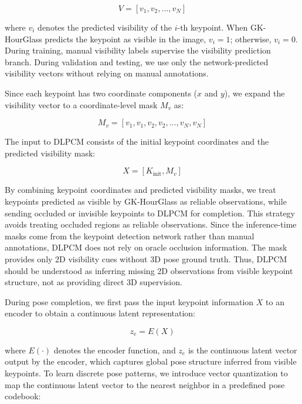 \documentclass[computers,article,submit,pdftex,moreauthors]{mdpi}
\begin{document}
\begin{equation}
V = [v_1, v_2, \ldots, v_N]
\end{equation}

where $v_i$ denotes the predicted visibility of the $i$-th keypoint. When GK-HourGlass predicts the keypoint as visible in the image, $v_i = 1$; otherwise, $v_i = 0$. During training, manual visibility labels supervise the visibility prediction branch. During validation and testing, we use only the network-predicted visibility vectors without relying on manual annotations.

Since each keypoint has two coordinate components ($x$ and $y$), we expand the visibility vector to a coordinate-level mask $M_v$ as:

\begin{equation}
M_v = [v_1, v_1, v_2, v_2, \ldots, v_N, v_N]
\end{equation}

The input to DLPCM consists of the initial keypoint coordinates and the predicted visibility mask:

\begin{equation}
X = [K_{\text{init}}, M_v]
\end{equation}

By combining keypoint coordinates and predicted visibility masks, we treat keypoints predicted as visible by GK-HourGlass as reliable observations, while sending occluded or invisible keypoints to DLPCM for completion. This strategy avoids treating occluded regions as reliable observations. Since the inference-time masks come from the keypoint detection network rather than manual annotations, DLPCM does not rely on oracle occlusion information. The mask provides only 2D visibility cues without 3D pose ground truth. Thus, DLPCM should be understood as inferring missing 2D observations from visible keypoint structure, not as providing direct 3D supervision.

During pose completion, we first pass the input keypoint information $X$ to an encoder to obtain a continuous latent representation:

\begin{equation}
z_e = E(X)
\end{equation}

where $E(\cdot)$ denotes the encoder function, and $z_e$ is the continuous latent vector output by the encoder, which captures global pose structure inferred from visible keypoints. To learn discrete pose patterns, we introduce vector quantization to map the continuous latent vector to the nearest neighbor in a predefined pose codebook:
\end{document}
